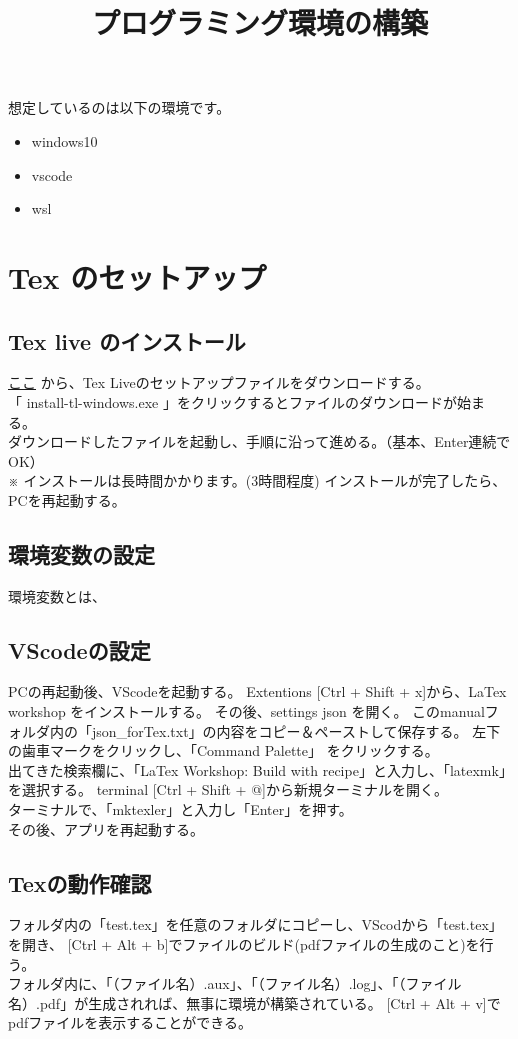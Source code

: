 \documentclass[a4paper]{jsarticle}
\author{}
\title{プログラミング環境の構築}
\date{}
\begin{document}
\maketitle

想定しているのは以下の環境です。
\begin{itemize}
    \item windows10
    \item vscode
    \item wsl
\end{itemize}

\section{\large Tex のセットアップ}
\subsection{Tex live のインストール}
\textcolor{blue}{\href{http://www.tug.org/texlive/acquire-netinstall.html}{ここ}} から、Tex Liveのセットアップファイルをダウンロードする。\\
「 install-tl-windows.exe 」をクリックするとファイルのダウンロードが始まる。\\
ダウンロードしたファイルを起動し、手順に沿って進める。（基本、Enter連続でOK）\\
※ インストールは長時間かかります。(3時間程度)
インストールが完了したら、PCを再起動する。
\subsection{環境変数の設定}
環境変数とは、
\subsection{VScodeの設定}
PCの再起動後、VScodeを起動する。
Extentions [Ctrl + Shift + x]から、LaTex workshop をインストールする。
その後、settings json を開く。
このmanualフォルダ内の「json\_forTex.txt」の内容をコピー＆ペーストして保存する。
左下の歯車マークをクリックし、「Command Palette」 をクリックする。\\
出てきた検索欄に、「LaTex Workshop: Build with recipe」と入力し、「latexmk」を選択する。
terminal [Ctrl + Shift + @]から新規ターミナルを開く。\\
ターミナルで、「mktexler」と入力し「Enter」を押す。\\
その後、アプリを再起動する。\\
\subsection{Texの動作確認}
フォルダ内の「test.tex」を任意のフォルダにコピーし、VScodから「test.tex」を開き、
[Ctrl + Alt + b]でファイルのビルド(pdfファイルの生成のこと)を行う。\\
フォルダ内に、「（ファイル名）.aux」、「（ファイル名）.log」、「（ファイル名）.pdf」が生成されれば、無事に環境が構築されている。
[Ctrl + Alt + v]でpdfファイルを表示することができる。
\end{document}
